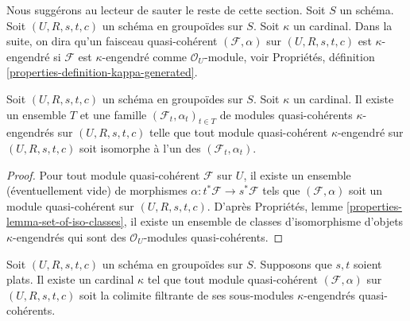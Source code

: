 \noindent
Nous suggérons au lecteur de sauter le reste de cette section. Soit $S$ un schéma.
Soit $(U, R, s, t, c)$ un schéma en groupoïdes sur $S$. Soit $\kappa$ un
cardinal. Dans la suite, on dira qu'un faisceau quasi-cohérent
$(\mathcal{F}, \alpha)$ sur $(U, R, s, t, c)$ est $\kappa$-engendré si
$\mathcal{F}$ est $\kappa$-engendré comme $\mathcal{O}_U$-module, voir
Propriétés, définition \ref{properties-definition-kappa-generated}.

\begin{lemma}
\label{lemma-set-of-iso-classes}
Soit $(U, R, s, t, c)$ un schéma en groupoïdes sur $S$.
Soit $\kappa$ un cardinal.
Il existe un ensemble $T$ et une famille $(\mathcal{F}_t, \alpha_t)_{t \in T}$ de
modules quasi-cohérents $\kappa$-engendrés sur $(U, R, s, t, c)$
telle que tout module quasi-cohérent $\kappa$-engendré sur
$(U, R, s, t, c)$ soit isomorphe à l'un des $(\mathcal{F}_t, \alpha_t)$.
\end{lemma}

\begin{proof}
Pour tout module quasi-cohérent $\mathcal{F}$ sur $U$, il existe un
ensemble (éventuellement vide) de morphismes $\alpha : t^*\mathcal{F} \to s^*\mathcal{F}$
tels que $(\mathcal{F}, \alpha)$ soit un module quasi-cohérent sur
$(U, R, s, t, c)$. D'après
Propriétés, lemme \ref{properties-lemma-set-of-iso-classes},
il existe un ensemble de classes d'isomorphisme d'objets $\kappa$-engendrés qui sont des
$\mathcal{O}_U$-modules quasi-cohérents.
\end{proof}

\begin{lemma}
\label{lemma-colimit-kappa}
Soit $(U, R, s, t, c)$ un schéma en groupoïdes sur $S$.
Supposons que $s, t$ soient plats. Il existe un
cardinal $\kappa$ tel que tout module quasi-cohérent
$(\mathcal{F}, \alpha)$ sur $(U, R, s, t, c)$
soit la colimite filtrante de ses sous-modules $\kappa$-engendrés
quasi-cohérents.
\end{lemma}

